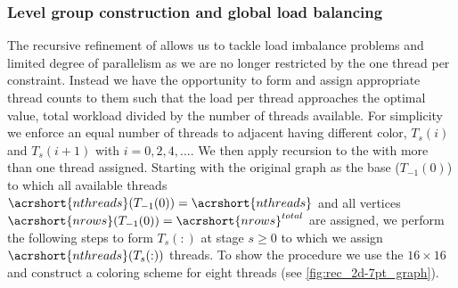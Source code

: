           
\subsubsection{Level group construction and global load balancing} \label{subsec:subgraph_selection}

The recursive refinement of \levelGroups allows us to tackle load imbalance problems and limited degree of parallelism as we are no longer restricted by the one thread per \levelGroup constraint.  Instead we have the opportunity to form \levelGroups and assign appropriate thread counts to them such that the load per thread approaches the optimal value, \ie total workload divided by the number of threads available. For simplicity we enforce an equal number of threads to adjacent \levelGroups having different color, \ie $T_s(i)$ and $T_s(i+1)$ with $i=0,2,4,...$. We then apply recursion to the \levelGroups with more than one thread assigned. Starting with the original graph as the base \levelGroup ($T_{-1}(0)$) to which all available threads $\acrshort{nthreads}(T_{-1}(0))=\acrshort{nthreads}$ and all vertices $\acrshort{nrows}(T_{-1}(0))=\acrshort{nrows}^{total}$ are assigned, we perform the following steps to form \levelGroups $T_s(:)$ at stage $s \ge 0$  to which we assign $\acrshort{nthreads}(T_{s}(:))$ threads. To show the procedure we use the $16 \times 16$ \stex and construct a coloring scheme for eight threads (see \cref{fig:rec_2d-7pt_graph}).

